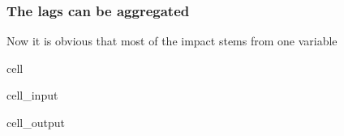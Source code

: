 \documentclass[letterpaper,10pt,english]{jupyterBook}
\begin{document}
\subsubsection{The lags can be aggregated}
\label{\detokenize{content/06_ModelAnalytics/Attribution:the-lags-can-be-aggregated}}
\sphinxAtStartPar
Now it is obvious that most of the impact stems from one variable

\begin{sphinxuseclass}{cell}\begin{sphinxVerbatimInput}

\begin{sphinxuseclass}{cell_input}
\begin{sphinxVerbatim}[commandchars=\\\{\}]
 
\end{sphinxVerbatim}

\end{sphinxuseclass}\end{sphinxVerbatimInput}
\begin{sphinxVerbatimOutput}

\begin{sphinxuseclass}{cell_output}
\noindent{}

\end{sphinxuseclass}\end{sphinxVerbatimOutput}

\end{sphinxuseclass}
\end{document}
